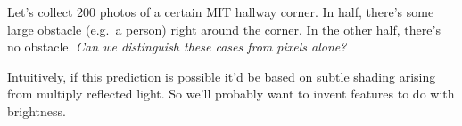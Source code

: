 
  Let's collect 200 photos of a certain MIT hallway corner.  In half, there's
  some large obstacle (e.g.\ a person) right around the corner.  In the other
  half, there's no obstacle.  \emph{Can we distinguish these cases from pixels
  alone?}

  Intuitively, if this prediction is possible it'd be based on subtle shading
  arising from multiply reflected light.  So we'll probably want to
  invent features to do with brightness.


